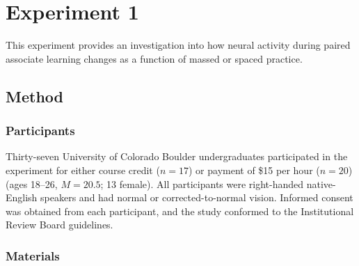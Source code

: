 
\section{Experiment 1}

This experiment provides an investigation into how neural activity during paired associate learning changes as a function of massed or spaced practice.

\subsection{Method}

\subsubsection{Participants}



Thirty-seven University of Colorado Boulder undergraduates participated in the experiment for either course credit ($n=17$) or payment of \$15 per hour ($n=20$) (ages 18--26, $M=20.5$; 13 female).  All participants were right-handed native-English speakers and had normal or corrected-to-normal vision.  Informed consent was obtained from each participant, and the study conformed to the
Institutional Review Board guidelines.

\subsubsection{Materials}

